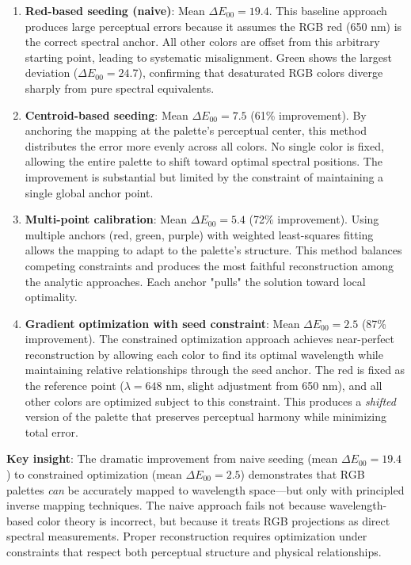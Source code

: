 \documentclass[12pt,a4paper]{article}
\newcommand{\deltaE}{\Delta E_{00}}
\begin{document}
\begin{enumerate}
\item \textbf{Red-based seeding (naive)}: Mean $\deltaE = 19.4$. This baseline approach produces large perceptual errors because it assumes the RGB red (650 nm) is the correct spectral anchor. All other colors are offset from this arbitrary starting point, leading to systematic misalignment. Green shows the largest deviation ($\deltaE = 24.7$), confirming that desaturated RGB colors diverge sharply from pure spectral equivalents.

\item \textbf{Centroid-based seeding}: Mean $\deltaE = 7.5$ (61\% improvement). By anchoring the mapping at the palette's perceptual center, this method distributes the error more evenly across all colors. No single color is fixed, allowing the entire palette to shift toward optimal spectral positions. The improvement is substantial but limited by the constraint of maintaining a single global anchor point.

\item \textbf{Multi-point calibration}: Mean $\deltaE = 5.4$ (72\% improvement). Using multiple anchors (red, green, purple) with weighted least-squares fitting allows the mapping to adapt to the palette's structure. This method balances competing constraints and produces the most faithful reconstruction among the analytic approaches. Each anchor "pulls" the solution toward local optimality.

\item \textbf{Gradient optimization with seed constraint}: Mean $\deltaE = 2.5$ (87\% improvement). The constrained optimization approach achieves near-perfect reconstruction by allowing each color to find its optimal wavelength while maintaining relative relationships through the seed anchor. The red is fixed as the reference point ($\lambda = 648$ nm, slight adjustment from 650 nm), and all other colors are optimized subject to this constraint. This produces a \emph{shifted} version of the palette that preserves perceptual harmony while minimizing total error.
\end{enumerate}

\textbf{Key insight}: The dramatic improvement from naive seeding (mean $\deltaE = 19.4$) to constrained optimization (mean $\deltaE = 2.5$) demonstrates that RGB palettes \emph{can} be accurately mapped to wavelength space—but only with principled inverse mapping techniques. The naive approach fails not because wavelength-based color theory is incorrect, but because it treats RGB projections as direct spectral measurements. Proper reconstruction requires optimization under constraints that respect both perceptual structure and physical relationships.
\end{document}
